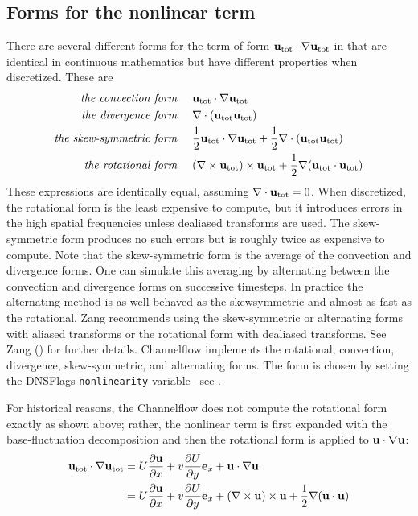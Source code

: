 \documentclass{article}[12pt]
\begin{document}
\subsection{Forms for the nonlinear term}
\label{sec:nonlinearity}

There are several  different forms for the term of form ${\bf u}_{\text{tot}} \cdot {\bf \nabla} {\bf u}_{\text{tot}}$
in  that are identical in continuous mathematics but have different
properties when discretized. These are
\begin{align}
\text{{\em the convection form }} & \quad {\bf u}_{\text{tot}} \cdot {\bf \nabla} {\bf u}_{\text{tot}} \\
\text{{\em the divergence form }} & \quad {\bf \nabla} \cdot({\bf u}_{\text{tot}} {\bf u}_{\text{tot}}) \\
\text{{\em the skew-symmetric form }} & \quad \frac{1}{2} {\bf u}_{\text{tot}} \cdot {\bf \nabla} {\bf u}_{\text{tot}}  + \frac{1}{2} {\bf \nabla} \cdot ({\bf u}_{\text{tot}} {\bf u}_{\text{tot}}) \\
\text{{\em the rotational form }} & \quad (\nabla \times {\bf u}_{\text{tot}}) \times {\bf u}_{\text{tot}} + \frac{1}{2} {\bf \nabla} ({\bf u}_{\text{tot}} \cdot {\bf u}_{\text{tot}})
\end{align}
These expressions are identically equal, assuming ${\bf \nabla} \cdot {\bf u}_{\text{tot}}
= 0$. When discretized, the rotational form is the least expensive to
compute, but it introduces errors in the high spatial frequencies
unless dealiased transforms are used. The skew-symmetric form produces
no such errors but is roughly twice as expensive to compute. Note that
the skew-symmetric form is the average of the convection and
divergence forms. One can simulate this averaging by alternating
between the convection and divergence forms on successive timesteps.
In practice the alternating method is as well-behaved as the
skewsymmetric and almost as fast as the rotational. Zang recommends
using the skew-symmetric or alternating forms with aliased transforms
or the rotational form with dealiased transforms. See Zang
(\cite{Zang91}) for further details. Channelflow implements the
rotational, convection, divergence, skew-symmetric, and alternating
forms. The form is chosen by setting the DNSFlags {\tt nonlinearity}
variable --see
.

For historical reasons, the Channelflow does not compute the rotational
form exactly as shown above; rather, the nonlinear term is first expanded
with the base-fluctuation decomposition and then the rotational form is
applied to ${\bf u} \cdot {\bf \nabla} {\bf u}$:
\begin{align}
{\bf u}_{\text{tot}} \cdot {\bf \nabla} {\bf u}_{\text{tot}} &= U \frac{\partial {\bf u}}{\partial x} + v \frac{\partial U}{\partial y} {\bf e}_x + {\bf u} \cdot {\bf \nabla} {\bf u}  \\
&= U \frac{\partial {\bf u}}{\partial x} + v \frac{\partial U}{\partial y} {\bf e}_x + (\nabla \times {\bf u}) \times {\bf u} + \frac{1}{2} {\bf \nabla} ({\bf u} \cdot {\bf u})
\end{align}
\end{document}
